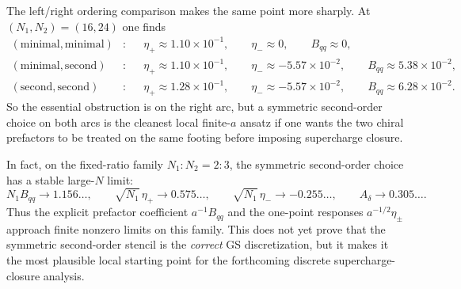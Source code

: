 \documentclass[11pt]{article}
\numberwithin{equation}{section}
\begin{document}
The left/right ordering comparison makes the same point more sharply. At $(N_1,N_2)=(16,24)$ one finds
\begin{equation}
\label{eq:s15-1-028}
\begin{aligned}
(\text{minimal},\text{minimal})&:
&&\eta_+\approx 1.10\times 10^{-1},\qquad
\eta_-\approx 0,\qquad
B_{qq}\approx 0,\\
(\text{minimal},\text{second})&:
&&\eta_+\approx 1.10\times 10^{-1},\qquad
\eta_-\approx -5.57\times 10^{-2},\qquad
B_{qq}\approx 5.38\times 10^{-2},\\
(\text{second},\text{second})&:
&&\eta_+\approx 1.28\times 10^{-1},\qquad
\eta_-\approx -5.57\times 10^{-2},\qquad
B_{qq}\approx 6.28\times 10^{-2}.
\end{aligned}
\end{equation}
So the essential obstruction is on the right arc, but a symmetric second-order choice on both arcs is the cleanest local finite-$a$ ansatz if one wants the two chiral prefactors to be treated on the same footing before imposing supercharge closure.

In fact, on the fixed-ratio family $N_1:N_2=2:3$, the symmetric second-order choice has a stable large-$N$ limit:
\begin{equation}
\label{eq:s15-1-029}
N_1 B_{qq}\to 1.156\ldots,
\qquad
\sqrt{N_1}\,\eta_+\to 0.575\ldots,
\qquad
\sqrt{N_1}\,\eta_-\to -0.255\ldots,
\qquad
A_\delta\to 0.305\ldots.
\end{equation}
Thus the explicit prefactor coefficient $a^{-1}B_{qq}$ and the one-point responses $a^{-1/2}\eta_\pm$ approach finite nonzero limits on this family. This does not yet prove that the symmetric second-order stencil is the \emph{correct} GS discretization, but it makes it the most plausible local starting point for the forthcoming discrete supercharge-closure analysis.
\end{document}
